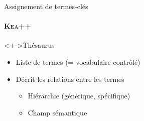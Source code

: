\begin{frame}{Assignement de termes-clés}\framesubtitle{\textsc{Kea}++~\cite{medelyan2006kea++}}
  \begin{block}<+->{Thésaurus}
    \begin{itemize}
      \item{Liste de termes (= vocabulaire contrôlé)}
      \item{Décrit les relations entre les termes}
      \begin{itemize}
        \item{Hiérarchie (générique, spécifique)}
        \item{Champ sémantique}
      \end{itemize}
    \end{itemize}
  \end{block}

\end{frame}

